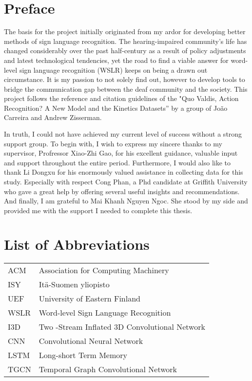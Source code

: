 \newpage



\section*{Preface}
The basis for the project initially originated from my ardor for developing better methods of sign language recognition. The hearing-impaired community's life has changed considerably over the past half-century as a result of policy adjustments and latest technological tendencies, yet the road to find a viable answer for word-level sign language recognition (WSLR) keeps on being a drawn out circumstance. It is my passion to not solely find out, however to develop tools to bridge the communication gap between the deaf community and the society. This project follows the reference and citation guidelines of the "Quo Valdis, Action Recognition? A New Model and the Kinetics Datasets” by a group of Jo\~{a}o Carreira and Andrew Zisserman.

In truth, I could not have achieved my current level of success without a strong support group. To begin with, I wish to express my sincere thanks to my supervisor, Profressor Xiao-Zhi Gao, for his excellent guidance, valuable input and support throughout the entire period.
Furthermore, I would also like to thank Li Dongxu for his enormously valued assistance in collecting data for this study.
Especially with respect Cong Phan, a Phd candidate at Griffith University who gave a great help by offering several useful insights and recommendations. 
And finally, I am grateful to Mai Khanh Nguyen Ngoc. She stood by my side and provided me with the support I needed to complete this thesis. 
\newpage


\section*{List of Abbreviations}

\begin{tabular}{lp{12.5cm}}

ACM & Association for Computing Machinery \\

ISY & Itä-Suomen yliopisto \\

UEF & University of Eastern Finland\\

WSLR & Word-level Sign Language Recognition\\

I3D & Two -Stream Inflated 3D Convolutional Network\\

CNN & Convolutional Neural Network\\

LSTM & Long-short Term Memory\\

TGCN & Temporal Graph Convolutional Network\\

\end{tabular}

